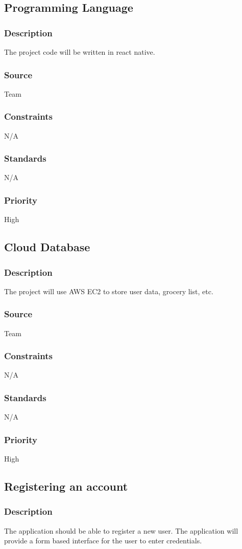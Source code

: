 
\subsection{Programming Language}
\subsubsection{Description}
The project code will be written in react native.
\subsubsection{Source}
Team
\subsubsection{Constraints}
N/A
\subsubsection{Standards}
N/A
\subsubsection{Priority}
High
\subsection{Cloud Database}
\subsubsection{Description}
The project will use AWS EC2 to store user data, grocery list, etc. 
\subsubsection{Source}
Team
\subsubsection{Constraints}
N/A
\subsubsection{Standards}
N/A
\subsubsection{Priority}
High
\subsection{Registering an account}
\subsubsection{Description}
The application should be able to register a new user. The application will provide a form based interface for the user to enter credentials.
